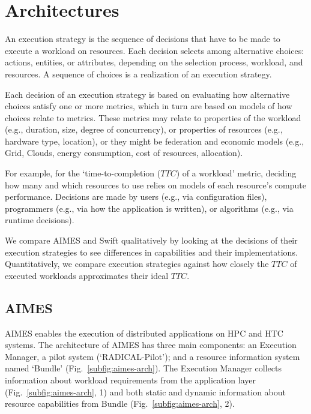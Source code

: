 \documentclass[10pt, conference, compsocconf]{IEEEtran}
\begin{document}
\section{Architectures}\label{sec:archs}

An execution strategy is the sequence of decisions that have to be made to
execute a workload on resources. Each decision selects among alternative
choices: actions, entities, or attributes, depending on the selection
process, workload, and resources. A sequence of choices is a realization of
an execution strategy.

Each decision of an execution strategy is based on evaluating how alternative
choices satisfy one or more metrics, which in turn are based on models of how
choices relate to metrics. These metrics may relate to properties of the
workload (e.g., duration, size, degree of concurrency), or properties of
resources (e.g., hardware type, location), or they might be federation and
economic models (e.g., Grid, Clouds, energy consumption, cost of resources,
allocation).

For example, for the `time-to-completion ($TTC$) of a workload' metric,
deciding how many and which resources to use relies on models of each
resource's compute performance. Decisions are made by users (e.g., via
configuration files), programmers (e.g., via how the application is written),
or algorithms (e.g., via runtime decisions).

We compare AIMES and Swift qualitatively by looking at the decisions of their
execution strategies to see differences in capabilities and their
implementations. Quantitatively, we compare execution strategies against how
closely the \(TTC\) of executed workloads approximates their ideal \(TTC\).

\subsection{AIMES}\label{sub:archs-aimes}

AIMES enables the execution of distributed applications on HPC and HTC systems.
The architecture of AIMES has three main components: an Execution Manager, a
pilot system (`RADICAL-Pilot'); and a resource information system named `Bundle'
(Fig.~\ref{subfig:aimes-arch}). The Execution Manager collects information about
workload requirements from the application layer (Fig.~\ref{subfig:aimes-arch},
1) and both static and dynamic information about resource capabilities from
Bundle (Fig.~\ref{subfig:aimes-arch}, 2).
\end{document}
